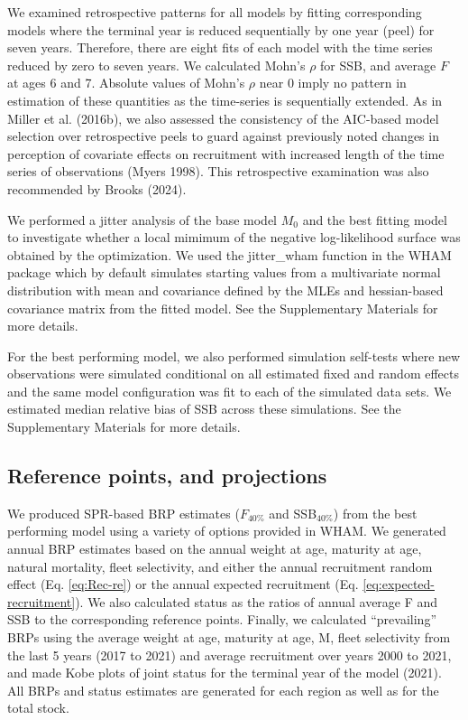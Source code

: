 \documentclass[
]{article}
\begin{document}
We examined retrospective patterns for all models by fitting
corresponding models where the terminal year is reduced sequentially by
one year (peel) for seven years. Therefore, there are eight fits of each
model with the time series reduced by zero to seven years. We calculated
Mohn's \(\rho\) for SSB, and average \(F\) at ages 6 and 7. Absolute
values of Mohn's \(\rho\) near 0 imply no pattern in estimation of these
quantities as the time-series is sequentially extended. As in Miller et
al. (2016b), we also assessed the consistency of the AIC-based model
selection over retrospective peels to guard against previously noted
changes in perception of covariate effects on recruitment with increased
length of the time series of observations (Myers 1998). This
retrospective examination was also recommended by Brooks (2024).

We performed a jitter analysis of the base model \(M_0\) and the best
fitting model to investigate whether a local mimimum of the negative
log-likelihood surface was obtained by the optimization. We used the
jitter\_wham function in the WHAM package which by default simulates
starting values from a multivariate normal distribution with mean and
covariance defined by the MLEs and hessian-based covariance matrix from
the fitted model. See the Supplementary Materials for more details.

For the best performing model, we also performed simulation self-tests
where new observations were simulated conditional on all estimated fixed
and random effects and the same model configuration was fit to each of
the simulated data sets. We estimated median relative bias of SSB across
these simulations. See the Supplementary Materials for more details.

\hypertarget{reference-points-and-projections}{%
\subsection*{Reference points, and
projections}\label{reference-points-and-projections}}

We produced SPR-based BRP estimates (\(F_{40\%}\) and SSB\(_{40\%}\))
from the best performing model using a variety of options provided in
WHAM. We generated annual BRP estimates based on the annual weight at
age, maturity at age, natural mortality, fleet selectivity, and either
the annual recruitment random effect (Eq. \ref{eq:Rec-re}) or the annual
expected recruitment (Eq. \ref{eq:expected-recruitment}). We also
calculated status as the ratios of annual average F and SSB to the
corresponding reference points. Finally, we calculated ``prevailing''
BRPs using the average weight at age, maturity at age, M, fleet
selectivity from the last 5 years (2017 to 2021) and average recruitment
over years 2000 to 2021, and made Kobe plots of joint status for the
terminal year of the model (2021). All BRPs and status estimates are
generated for each region as well as for the total stock.
\end{document}
